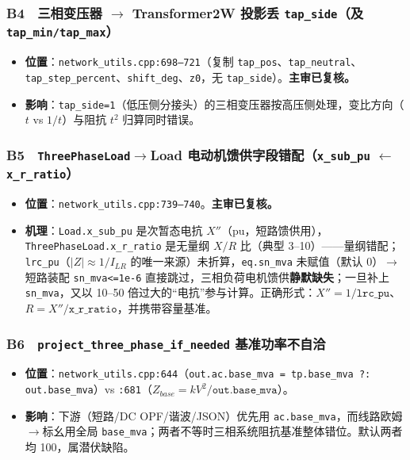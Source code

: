 \documentclass[11pt,a4paper,fontset=fandol]{ctexart}
\newcommand{\file}[1]{\texttt{#1}}
\begin{document}
\subsubsection*{B4　三相变压器 $\to$ Transformer2W 投影丢 \texttt{tap\_side}（及 \texttt{tap\_min/tap\_max}）}
\begin{itemize}
  \item \textbf{位置}：\file{network\_utils.cpp:698--721}（复制 \texttt{tap\_pos}、\texttt{tap\_neutral}、\texttt{tap\_step\_percent}、\texttt{shift\_deg}、\texttt{z0}，无 \texttt{tap\_side}）。\textbf{主审已复核。}
  \item \textbf{影响}：\texttt{tap\_side=1}（低压侧分接头）的三相变压器按高压侧处理，变比方向（$t$ vs $1/t$）与阻抗 $t^2$ 归算同时错误。
\end{itemize}

\subsubsection*{B5　\texttt{ThreePhaseLoad}$\to$Load 电动机馈供字段错配（\texttt{x\_sub\_pu} $\leftarrow$ \texttt{x\_r\_ratio}）}
\begin{itemize}
  \item \textbf{位置}：\file{network\_utils.cpp:739--740}。\textbf{主审已复核。}
  \item \textbf{机理}：\texttt{Load.x\_sub\_pu} 是次暂态电抗 $X''$（pu，短路馈供用），\texttt{ThreePhaseLoad.x\_r\_ratio} 是无量纲 $X/R$ 比（典型 3--10）——量纲错配；\texttt{lrc\_pu}（$|Z|\approx 1/I_{LR}$ 的唯一来源）未折算，\texttt{eq.sn\_mva} 未赋值（默认 0）$\to$ 短路装配 \texttt{sn\_mva<=1e-6} 直接跳过，三相负荷电机馈供\textbf{静默缺失}；一旦补上 \texttt{sn\_mva}，又以 10--50 倍过大的``电抗''参与计算。正确形式：$X'' = 1/\texttt{lrc\_pu}$、$R = X''/\texttt{x\_r\_ratio}$，并携带容量基准。
\end{itemize}

\subsubsection*{B6　\texttt{project\_three\_phase\_if\_needed} 基准功率不自洽}
\begin{itemize}
  \item \textbf{位置}：\file{network\_utils.cpp:644}（\texttt{out.ac.base\_mva = tp.base\_mva ?: out.base\_mva}）vs \file{:681}（$Z_{base}=kV^2/\texttt{out.base\_mva}$）。
  \item \textbf{影响}：下游（短路/DC OPF/谐波/JSON）优先用 \texttt{ac.base\_mva}，而线路欧姆$\to$标幺用全局 \texttt{base\_mva}；两者不等时三相系统阻抗基准整体错位。默认两者均 100，属潜伏缺陷。
\end{itemize}
\end{document}
